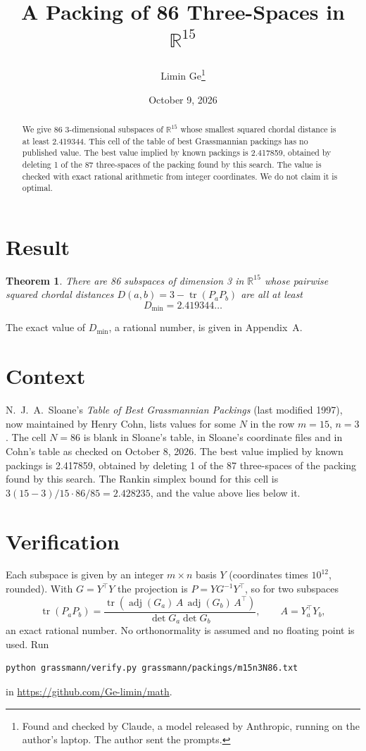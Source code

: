 \documentclass[11pt,a4paper]{article}
\title{A Packing of 86 Three-Spaces in $\mathbb{R}^{15}$}
\author{Limin Ge\thanks{Found and checked by Claude, a model released by Anthropic, running on the author's laptop. The author sent the prompts.}}
\date{October 9, 2026}
\newtheorem*{theorem}{Theorem}
\begin{document}
\maketitle
\begin{abstract}
We give 86 3-dimensional subspaces of $\mathbb{R}^{15}$ whose smallest squared chordal distance is at least 2.419344. This cell of the table of best Grassmannian packings has no published value. The best value implied by known packings is 2.417859, obtained by deleting 1 of the 87 three-spaces of the packing found by this search. The value is checked with exact rational arithmetic from integer coordinates. We do not claim it is optimal.
\end{abstract}

\section{Result}
\begin{theorem}
There are 86 subspaces of dimension 3 in $\mathbb{R}^{15}$ whose pairwise squared chordal distances $D(a,b) = 3 - \operatorname{tr}(P_aP_b)$ are all at least
\[ D_{\min} = 2.419344\ldots \]
\end{theorem}
The exact value of $D_{\min}$, a rational number, is given in Appendix~A.


\section{Context}
N.~J.~A.~Sloane's \emph{Table of Best Grassmannian Packings} (last modified 1997), now maintained by Henry Cohn, lists values for some $N$ in the row $m=15$, $n=3$. The cell $N=86$ is blank in Sloane's table, in Sloane's coordinate files and in Cohn's table as checked on October 8, 2026. The best value implied by known packings is 2.417859, obtained by deleting 1 of the 87 three-spaces of the packing found by this search. The Rankin simplex bound for this cell is $3(15-3)/15\cdot 86/85 = 2.428235$, and the value above lies below it.


\section{Verification}
Each subspace is given by an integer $m\times n$ basis $Y$ (coordinates times $10^{12}$, rounded). With $G=Y^\top Y$ the projection is $P=YG^{-1}Y^\top$, so for two subspaces
\[ \operatorname{tr}(P_aP_b)=\frac{\operatorname{tr}(\operatorname{adj}(G_a)\,A\,\operatorname{adj}(G_b)\,A^\top)}{\det G_a\det G_b},\qquad A=Y_a^\top Y_b, \]
an exact rational number. No orthonormality is assumed and no floating point is used. Run
\begin{verbatim}
python grassmann/verify.py grassmann/packings/m15n3N86.txt
\end{verbatim}
in \url{https://github.com/Ge-limin/math}.
\end{document}
